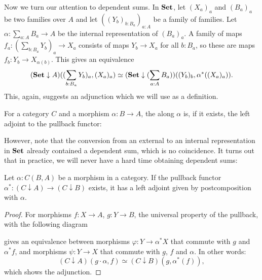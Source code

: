 Now we turn our attention to dependent sums. In $ \mathbf{Set} $, let $ (X_a)_a $ and $ (B_a)_a $ be two families over $ A $ and let $ ((Y_b)_{b : B_a})_{a : A} $ be a family of families. Let $ \alpha: \sum_{a : A} B_a \to A $ be the internal representation of $ (B_a)_a $. A family of maps $ f_a : (\sum_{b : B_a} Y_b)_a \to X_a $ consists of maps $ Y_b \to X_a $ for all $ b : B_a $, so these are maps $ f_b : Y_b \to X_{\alpha(b)} $. This gives an equivalence
\[ (\mathbf{Set} \downarrow A)((\sum_{b : B_a} Y_b)_a, (X_a)_a) \simeq (\mathbf{Set} \downarrow (\sum_{a : A} B_a))((Y_b)_b, \alpha^*((X_a)_a)). \]
This, again, suggests an adjunction which we will use as a definition.
\begin{definition}
  For a category $ C $ and a morphism $ \alpha: B \to A $, the  along $ \alpha $ is, if it exists, the left adjoint to the pullback functor:
  \begin{center}
  \end{center}
\end{definition}

However, note that the conversion from an external to an internal representation in $ \mathbf{Set} $ already contained a dependent sum, which is no coincidence. It turns out that in practice, we will never have a hard time obtaining dependent sums:
\begin{lemma}
  Let $ \alpha : C(B, A) $ be a morphism in a category. If the pullback functor $ \alpha^*: (C \downarrow A) \to (C \downarrow B) $ exists, it has a left adjoint given by postcomposition with $ \alpha $.
\end{lemma}
\begin{proof}
  For morphisms $ f: X \to A $, $ g: Y \to B $, the universal property of the pullback, with the following diagram
  \begin{center}
  \end{center}
  gives an equivalence between morphisms $ \varphi: Y \to \alpha^* X $ that commute with $ g $ and $ \alpha^* f $, and morphisms $ \psi: Y \to X $ that commute with $ g $, $ f $ and $ \alpha $. In other words:
  \[ (C \downarrow A)(g \cdot \alpha, f) \simeq (C \downarrow B)(g, \alpha^*(f)), \]
  which shows the adjunction.
\end{proof}

